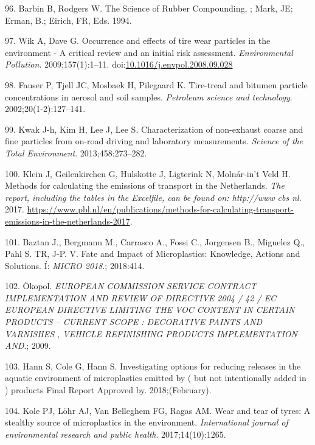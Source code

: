 \documentclass[icelandic,]{book}
\begin{document}
\leavevmode\hypertarget{ref-barbin1994science}{}%
96. Barbin B, Rodgers W. The Science of Rubber Compounding, ; Mark, JE; Erman, B.; Eirich, FR, Eds. 1994.

\leavevmode\hypertarget{ref-Wik2009}{}%
97. Wik A, Dave G. Occurrence and effects of tire wear particles in the environment - A critical review and an initial risk assessment. \emph{Environmental Pollution}. 2009;157(1):1--11. doi:\href{https://doi.org/10.1016/j.envpol.2008.09.028}{10.1016/j.envpol.2008.09.028}

\leavevmode\hypertarget{ref-fauser2002tire}{}%
98. Fauser P, Tjell JC, Mosbaek H, Pilegaard K. Tire-tread and bitumen particle concentrations in aerosol and soil samples. \emph{Petroleum science and technology}. 2002;20(1-2):127--141.

\leavevmode\hypertarget{ref-kwak2013characterization}{}%
99. Kwak J-h, Kim H, Lee J, Lee S. Characterization of non-exhaust coarse and fine particles from on-road driving and laboratory measurements. \emph{Science of the Total Environment}. 2013;458:273--282.

\leavevmode\hypertarget{ref-klein2017methods}{}%
100. Klein J, Geilenkirchen G, Hulskotte J, Ligterink N, Molnár-in't Veld H. Methods for calculating the emissions of transport in the Netherlands. \emph{The report, including the tables in the Excelfile, can be found on: http://www cbs nl}. 2017. \url{https://www.pbl.nl/en/publications/methods-for-calculating-transport-emissions-in-the-netherlands-2017}.

\leavevmode\hypertarget{ref-BaztanJ2018}{}%
101. Baztan J., Bergmann M., Carrasco A., Fossi C., Jorgensen B., Miguelez Q., Pahl S. TR, J-P. V. Fate and Impact of Microplastics: Knowledge, Actions and Solutions. Í: \emph{MICRO 2018}.; 2018:414.

\leavevmode\hypertarget{ref-Commission2009}{}%
102. Ökopol. \emph{EUROPEAN COMMISSION SERVICE CONTRACT IMPLEMENTATION AND REVIEW OF DIRECTIVE 2004 / 42 / EC EUROPEAN DIRECTIVE LIMITING THE VOC CONTENT IN CERTAIN PRODUCTS -- CURRENT SCOPE : DECORATIVE PAINTS AND VARNISHES , VEHICLE REFINISHING PRODUCTS IMPLEMENTATION AND}.; 2009.

\leavevmode\hypertarget{ref-Hann2018}{}%
103. Hann S, Cole G, Hann S. Investigating options for reducing releases in the aquatic environment of microplastics emitted by ( but not intentionally added in ) products Final Report Approved by. 2018;(February).

\leavevmode\hypertarget{ref-kole2017wear}{}%
104. Kole PJ, Löhr AJ, Van Belleghem FG, Ragas AM. Wear and tear of tyres: A stealthy source of microplastics in the environment. \emph{International journal of environmental research and public health}. 2017;14(10):1265.
\end{document}

